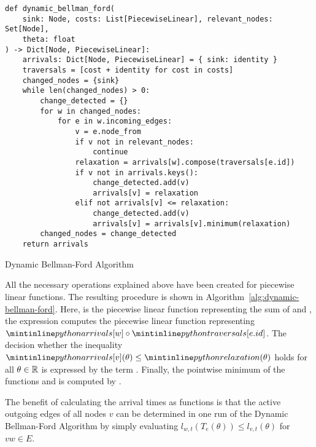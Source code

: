\begin{algorithm}[h]
    \begin{verbatim}
def dynamic_bellman_ford(
    sink: Node, costs: List[PiecewiseLinear], relevant_nodes: Set[Node],
    theta: float
) -> Dict[Node, PiecewiseLinear]:
    arrivals: Dict[Node, PiecewiseLinear] = { sink: identity }
    traversals = [cost + identity for cost in costs]
    changed_nodes = {sink}
    while len(changed_nodes) > 0:
        change_detected = {}
        for w in changed_nodes:
            for e in w.incoming_edges:
                v = e.node_from
                if v not in relevant_nodes:
                    continue
                relaxation = arrivals[w].compose(traversals[e.id])
                if v not in arrivals.keys():
                    change_detected.add(v)
                    arrivals[v] = relaxation
                elif not arrivals[v] <= relaxation:
                    change_detected.add(v)
                    arrivals[v] = arrivals[v].minimum(relaxation)
        changed_nodes = change_detected
    return arrivals
    \end{verbatim}
    \caption{Dynamic Bellman-Ford Algorithm}
    \label{alg:dynamic-bellman-ford}
\end{algorithm}

All the necessary operations explained above have been created for piecewise linear functions.
The resulting procedure is shown in Algorithm~\ref{alg:dynamic-bellman-ford}.
Here,  is the piecewise linear function representing the sum of  and , the expression  computes the piecewise linear function representing $\code{arrivals[w]}\circ \code{traversals[e.id]}$.
The decision whether the inequality $\code{arrivals[v]}(\theta) \leq \code{relaxation}(\theta)$ holds for all $\theta \in \mathbb{R}$ is expressed by the term . 
Finally, the pointwise minimum of the functions  and  is computed by .


The benefit of calculating the arrival times as functions is that the active outgoing edges of all nodes $v$ can be determined in one run of the Dynamic Bellman-Ford Algorithm by simply evaluating $l_{w,t}(T_e(\theta)) \leq  l_{v,t}(\theta)$ for $vw\in E$.